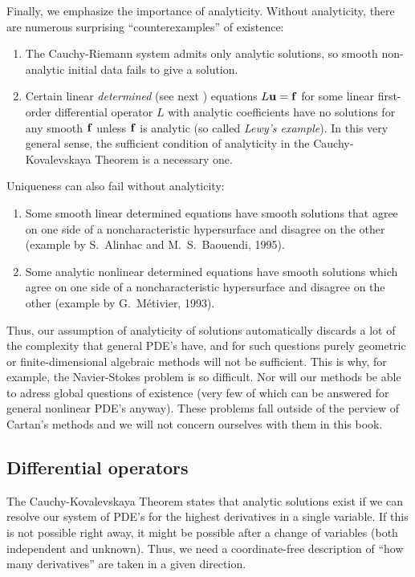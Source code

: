 Finally, we emphasize the importance of analyticity. Without analyticity, there are numerous surprising ``counterexamples'' of existence:
\begin{enumerate}
    \item The Cauchy-Riemann system admits only analytic solutions, so smooth non-analytic initial data fails to give a solution.
    \item Certain linear \emph{determined} (see next \subsect) equations $L\bf{u}=\bf{f}$ for some linear first-order differential operator $L$ with analytic coefficients have no solutions for any smooth $\bf{f}$ unless $\bf{f}$ is analytic (so called \emph{Lewy's example}). In this very general sense, the sufficient condition of analyticity in the Cauchy-Kovalevskaya Theorem is a necessary one.
\end{enumerate}
Uniqueness can also fail without analyticity:
\begin{enumerate}
    \item Some smooth linear determined equations have smooth solutions that agree on one side of a noncharacteristic hypersurface and disagree on the other (example by S.~Alinhac and M.~S.~Baouendi, 1995).
    \item Some analytic nonlinear determined equations have smooth solutions which agree on one side of a noncharacteristic hypersurface and disagree on the other (example by G.~M\'etivier, 1993).
\end{enumerate}

Thus, our assumption of analyticity of solutions automatically discards a lot of the complexity that general PDE's have, and for such questions purely geometric or finite-dimensional algebraic methods will not be sufficient. This is why, for example, the Navier-Stokes problem is so difficult. Nor will our methods be able to adress global questions of existence (very few of which can be answered for general nonlinear PDE's anyway). These problems fall outside of the perview of Cartan's methods and we will not concern ourselves with them in this book.









\subsection{Differential operators}


The Cauchy-Kovalevskaya Theorem states that analytic solutions exist if we can resolve our system of PDE's for the highest derivatives in a single variable. If this is not possible right away, it might be possible after a change of variables (both independent and unknown). Thus, we need a coordinate-free description of ``how many derivatives'' are taken in a given direction.


